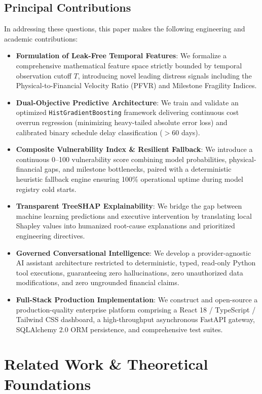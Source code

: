 \documentclass[conference]{IEEEtran}
\begin{document}
\subsection{Principal Contributions}
In addressing these questions, this paper makes the following engineering and academic contributions:
\begin{itemize}
    \item \textbf{Formulation of Leak-Free Temporal Features}: We formalize a comprehensive mathematical feature space strictly bounded by temporal observation cutoff $T$, introducing novel leading distress signals including the Physical-to-Financial Velocity Ratio (PFVR) and Milestone Fragility Indices.
    \item \textbf{Dual-Objective Predictive Architecture}: We train and validate an optimized \texttt{HistGradientBoosting} framework delivering continuous cost overrun regression (minimizing heavy-tailed absolute error loss) and calibrated binary schedule delay classification ($>60$ days).
    \item \textbf{Composite Vulnerability Index \& Resilient Fallback}: We introduce a continuous 0--100 vulnerability score combining model probabilities, physical-financial gaps, and milestone bottlenecks, paired with a deterministic heuristic fallback engine ensuring 100\% operational uptime during model registry cold starts.
    \item \textbf{Transparent TreeSHAP Explainability}: We bridge the gap between machine learning predictions and executive intervention by translating local Shapley values into humanized root-cause explanations and prioritized engineering directives.
    \item \textbf{Governed Conversational Intelligence}: We develop a provider-agnostic AI assistant architecture restricted to deterministic, typed, read-only Python tool executions, guaranteeing zero hallucinations, zero unauthorized data modifications, and zero ungrounded financial claims.
    \item \textbf{Full-Stack Production Implementation}: We construct and open-source a production-quality enterprise platform comprising a React 18 / TypeScript / Tailwind CSS dashboard, a high-throughput asynchronous FastAPI gateway, SQLAlchemy 2.0 ORM persistence, and comprehensive test suites.
\end{itemize}

\section{Related Work \& Theoretical Foundations}
\end{document}
